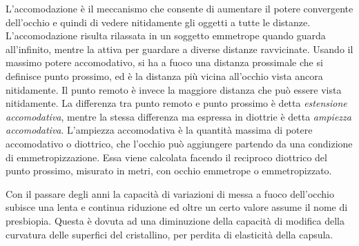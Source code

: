 L’accomodazione è il meccanismo che consente di aumentare il potere convergente dell’occhio e quindi di vedere nitidamente gli oggetti a tutte le distanze.
L’accomodazione risulta rilassata in un soggetto emmetrope quando guarda all’infinito, mentre la attiva per guardare a diverse distanze ravvicinate. Usando il massimo potere accomodativo, si ha a fuoco una distanza prossimale che si definisce punto prossimo, ed è la distanza più vicina all’occhio vista ancora nitidamente. Il punto remoto è invece la maggiore distanza che può essere vista nitidamente. La differenza tra punto remoto e punto prossimo è detta \emph{estensione accomodativa}, mentre la stessa differenza ma espressa in diottrie è detta \emph{ampiezza accomodativa}. L’ampiezza accomodativa è la quantità massima di potere accomodativo o diottrico, che l’occhio può aggiungere partendo da una condizione di emmetropizzazione. Essa viene calcolata facendo il reciproco diottrico del punto prossimo, misurato in metri, con occhio emmetrope o emmetropizzato.

Con il passare degli anni la capacità di variazioni di messa a fuoco dell’occhio subisce una lenta e continua riduzione ed oltre un certo valore assume il nome di presbiopia. Questa è dovuta ad una diminuzione della capacità di modifica della curvatura delle superfici del cristallino, per perdita di elasticità della capsula.
\\\

